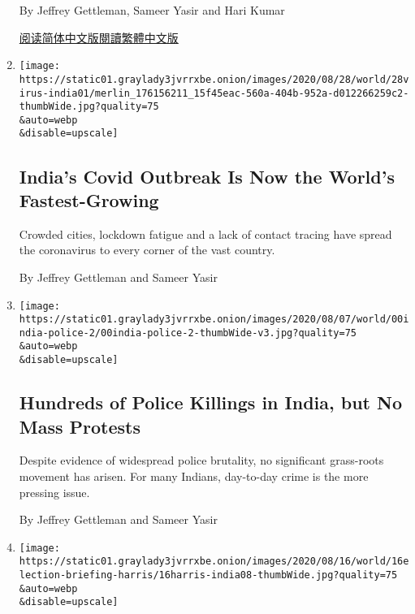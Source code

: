 \begin{enumerate}
  By Jeffrey Gettleman, Sameer Yasir and Hari Kumar

  \href{https://cn.nytimes3xbfgragh.onion/world/20200901/india-china-troops-border/}{阅读简体中文版}\href{https://cn.nytimes3xbfgragh.onion/world/20200901/india-china-troops-border/zh-hant/}{閱讀繁體中文版}
\item
  \href{/2020/08/28/world/asia/india-coronavirus.html}{}

  \texttt{[image: https://static01.graylady3jvrrxbe.onion/images/2020/08/28/world/28virus-india01/merlin\_176156211\_15f45eac-560a-404b-952a-d012266259c2-thumbWide.jpg?quality=75\\\&auto=webp\\\&disable=upscale]}

  \hypertarget{indias-covid-outbreak-is-now-the-worlds-fastest-growing}{%
  \subsection{India's Covid Outbreak Is Now the World's
  Fastest-Growing}\label{indias-covid-outbreak-is-now-the-worlds-fastest-growing}}

  Crowded cities, lockdown fatigue and a lack of contact tracing have
  spread the coronavirus to every corner of the vast country.

  By Jeffrey Gettleman and Sameer Yasir
\item
  \href{/2020/08/20/world/asia/india-police-brutality.html}{}

  \texttt{[image: https://static01.graylady3jvrrxbe.onion/images/2020/08/07/world/00india-police-2/00india-police-2-thumbWide-v3.jpg?quality=75\\\&auto=webp\\\&disable=upscale]}

  \hypertarget{hundreds-of-police-killings-in-india-but-no-mass-protests}{%
  \subsection{Hundreds of Police Killings in India, but No Mass
  Protests}\label{hundreds-of-police-killings-in-india-but-no-mass-protests}}

  Despite evidence of widespread police brutality, no significant
  grass-roots movement has arisen. For many Indians, day-to-day crime is
  the more pressing issue.

  By Jeffrey Gettleman and Sameer Yasir
\item
  \href{/live/2020/08/16/us/election-trump-vs-biden/how-kamala-harriss-family-in-india-helped-shape-her-values}{}

  \texttt{[image: https://static01.graylady3jvrrxbe.onion/images/2020/08/16/world/16election-briefing-harris/16harris-india08-thumbWide.jpg?quality=75\\\&auto=webp\\\&disable=upscale]}


\end{enumerate}
